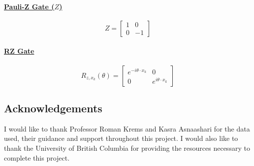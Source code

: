 \documentclass[
]{article}
\begin{document}
\paragraph*{\texorpdfstring{\underline{Pauli-Z Gate (\(Z\))}}{}}\label{section-16}

\[
  Z = \begin{bmatrix}
  1 & 0 \\
  0 & -1
  \end{bmatrix}
  \]

\paragraph*{\texorpdfstring{\underline{RZ Gate}}{}}\label{section-17}

\[
  R_{z,x_k}\left(\theta \right) = \begin{bmatrix}
  e^{-i\theta \cdot x_k} & 0 \\
  0 & e^{i\theta \cdot x_k} 
  \end{bmatrix}
  \]


\subsection*{Acknowledgements}\label{acknowledgements}

I would like to thank Professor Roman Krems and Kasra Asnaashari for the
data used, their guidance and support throughout this project. I would
also like to thank the University of British Columbia for providing the
resources necessary to complete this project.
\end{document}
